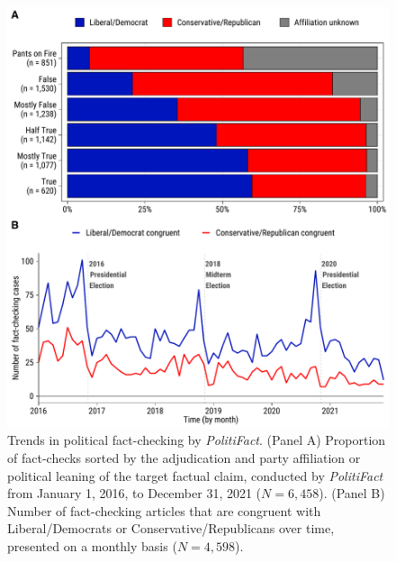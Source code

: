\documentclass[
  12pt,
]{article}
\begin{document}
\begin{figure}[!ht]
\centering
\includegraphics[width=1\textwidth]{../fig/merged_fig1.pdf}
\caption{Trends in political fact-checking by {\em PolitiFact}. (Panel A) Proportion of fact-checks sorted by the adjudication and party affiliation or political leaning of the target factual claim, conducted by {\em PolitiFact} from January 1, 2016, to December 31, 2021 ($N = 6,458$). (Panel B) Number of fact-checking articles that are congruent with Liberal/Democrats or Conservative/Republicans over time, presented on a monthly basis ($N = 4,598$).}
\label{fig:fig1}
\end{figure}

\newpage
\end{document}
